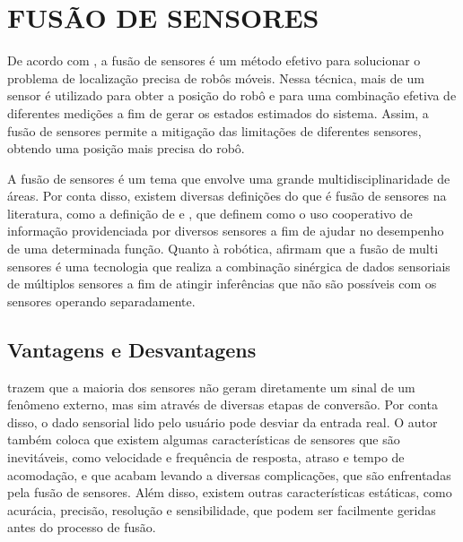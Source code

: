 \documentclass[acronym, symbols, table, deposito]{fei}
\begin{document}
			
	
	\section{FUSÃO DE SENSORES}
	

		De acordo com \textcite{marton2013two}, a fusão de sensores é um método efetivo para solucionar o problema de localização precisa de robôs móveis. Nessa técnica, mais de um sensor é utilizado para obter a posição do robô e para uma combinação efetiva de diferentes medições a fim de gerar os estados estimados do sistema. Assim, a fusão de sensores permite a mitigação das limitações de diferentes sensores, obtendo uma posição mais precisa do robô.
		
		A fusão de sensores é um tema que envolve uma grande multidisciplinaridade de áreas. Por conta disso, existem diversas definições do que é fusão de sensores na literatura, como a definição de \textcite{castanedo2013review} e \textcite{nagla2014multisensor}, que definem como o uso cooperativo de informação providenciada por diversos sensores a fim de ajudar no desempenho de uma determinada função. Quanto à robótica, \textcite{luo2011multisensor} afirmam que a fusão de multi sensores é uma tecnologia que realiza a combinação sinérgica de dados sensoriais de múltiplos sensores a fim de atingir inferências que não são possíveis com os sensores operando separadamente.
		
		\subsection{Vantagens e Desvantagens}
		
			\textcite{fung2017sensor} trazem que a maioria dos sensores não geram diretamente um sinal de um fenômeno externo, mas sim através de diversas etapas de conversão. Por conta disso, o dado sensorial lido pelo usuário pode desviar da entrada real. O autor também coloca que existem algumas características de sensores que são inevitáveis, como velocidade e frequência de resposta, atraso e tempo de acomodação, e que acabam levando a diversas complicações, que são enfrentadas pela fusão de sensores. Além disso, existem outras características estáticas, como acurácia, precisão, resolução e sensibilidade, que podem ser facilmente geridas antes do processo de fusão.
			
\end{document}
